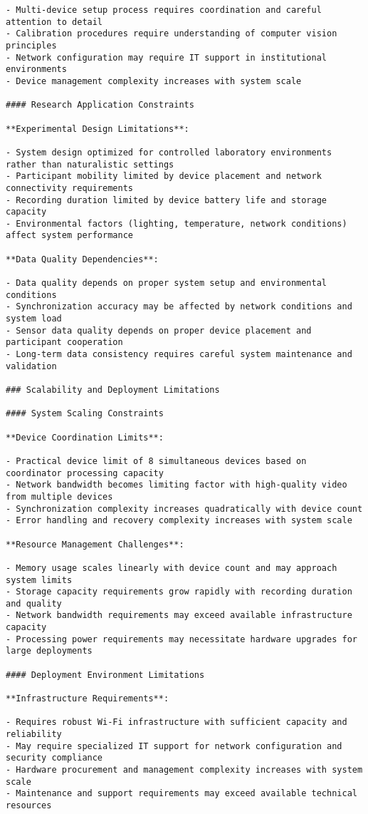 \documentclass[11pt,a4paper]{report}
\begin{document}
\begin{verbatim}
- Multi-device setup process requires coordination and careful attention to detail
- Calibration procedures require understanding of computer vision principles
- Network configuration may require IT support in institutional environments
- Device management complexity increases with system scale

#### Research Application Constraints

**Experimental Design Limitations**:

- System design optimized for controlled laboratory environments rather than naturalistic settings
- Participant mobility limited by device placement and network connectivity requirements
- Recording duration limited by device battery life and storage capacity
- Environmental factors (lighting, temperature, network conditions) affect system performance

**Data Quality Dependencies**:

- Data quality depends on proper system setup and environmental conditions
- Synchronization accuracy may be affected by network conditions and system load
- Sensor data quality depends on proper device placement and participant cooperation
- Long-term data consistency requires careful system maintenance and validation

### Scalability and Deployment Limitations

#### System Scaling Constraints

**Device Coordination Limits**:

- Practical device limit of 8 simultaneous devices based on coordinator processing capacity
- Network bandwidth becomes limiting factor with high-quality video from multiple devices
- Synchronization complexity increases quadratically with device count
- Error handling and recovery complexity increases with system scale

**Resource Management Challenges**:

- Memory usage scales linearly with device count and may approach system limits
- Storage capacity requirements grow rapidly with recording duration and quality
- Network bandwidth requirements may exceed available infrastructure capacity
- Processing power requirements may necessitate hardware upgrades for large deployments

#### Deployment Environment Limitations

**Infrastructure Requirements**:

- Requires robust Wi-Fi infrastructure with sufficient capacity and reliability
- May require specialized IT support for network configuration and security compliance
- Hardware procurement and management complexity increases with system scale
- Maintenance and support requirements may exceed available technical resources


\end{verbatim}
\end{document}
